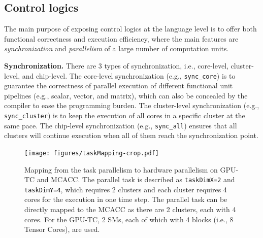 \subsection{Control logics}

The main purpose of exposing control logics at the language level is to offer both functional correctness and execution efficiency, where the main features are \emph{synchronization} and \emph{parallelism} of a large number of computation units.

\textbf{Synchronization.} There are $3$ types of synchronization, i.e., core-level, cluster-level, and chip-level. The core-level synchronization (e.g., \texttt{sync\_core}) is to guarantee the correctness of parallel execution of different functional unit pipelines (e.g., scalar, vector, and matrix), which can also be concealed by the compiler to ease the programming burden. The cluster-level synchronization (e.g., \texttt{sync\_cluster}) is to keep the execution of all cores in a specific cluster at the same pace. The chip-level synchronization (e.g., \texttt{sync\_all}) ensures that all clusters will continue execution when all of them reach the synchronization point. %

\begin{figure}
  \centering
\texttt{[image: figures/taskMapping-crop.pdf]}
\vspace{-12pt}
\caption{\footnotesize Mapping from the task parallelism to hardware parallelism on GPU-TC and MCACC. The parallel task is described as \texttt{taskDimX=2} and \texttt{taskDimY=4}, which requires 2 clusters and each cluster requires 4 cores for the execution in one time step. The parallel task can be directly mapped to the MCACC as there are 2 clusters, each with 4 cores. For the GPU-TC, 2 SMs, each of which with 4 blocks (i.e., 8 Tensor Cores), are used.}%
\label{fig:taskMapping}
\vspace{-15pt}
\end{figure}

